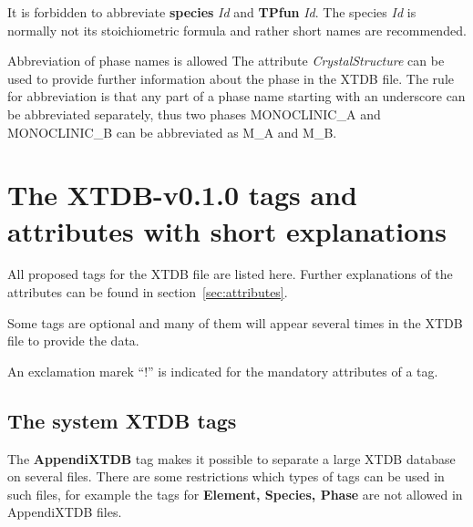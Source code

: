 \documentclass{article}
\begin{document}
It is forbidden to abbreviate {\bf species} {\em Id} and {\bf TPfun}
{\em Id}.  The species {\em Id} is normally not its stoichiometric
formula and rather short names are recommended.

Abbreviation of phase names is allowed The attribute {\em
  CrystalStructure} can be used to provide further information about
the phase in the XTDB file.  The rule for abbreviation is that any
part of a phase name starting with an underscore can be abbreviated
separately, thus two phases MONOCLINIC\_A and MONOCLINIC\_B can be
abbreviated as M\_A and M\_B.

\newpage

\section{The XTDB-v0.1.0 tags and attributes with short explanations}\label{sec:tags}

All proposed tags for the XTDB file are listed here. Further
explanations of the attributes can be found in
section~\ref{sec:attributes}.

Some tags are optional and many of them will appear several times in
the XTDB file to provide the data.

An exclamation marek ``!'' is indicated for the mandatory attributes of a tag.

\subsection{The system XTDB tags}\label{sec:first}

The {\bf AppendiXTDB} tag makes it possible to separate a large XTDB
database on several files.  There are some restrictions which types of
tags can be used in such files, for example the tags for {\bf Element,
  Species, Phase} are not allowed in AppendiXTDB files.
\end{document}
